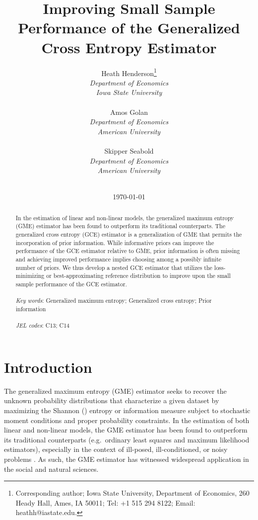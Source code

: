 \documentclass[english]{article}
\title{Improving Small Sample Performance of the Generalized Cross 
Entropy Estimator}
\author{
Heath Henderson\thanks{Corresponding author; Iowa State University,
Department of Economics, 260 Heady Hall, Ames, IA 50011; 
Tel: +1 515 294 8122;  Email: heathh@iastate.edu.}\\
\textit{Department of Economics} \\
\textit{Iowa State University} \\
\\
Amos Golan \\
\textit{Department of Economics}\\
\textit{American University} \\
\\
Skipper Seabold \\
\textit{Department of Economics}\\
\textit{American University}
\\ \\
}
\date{\today}
\begin{document}

\begin{titlepage}
\maketitle

\begin{abstract}
In the estimation of linear and non-linear models, the generalized maximum 
entropy (GME) estimator has been found to outperform its traditional 
counterparts.
The generalized cross entropy (GCE) estimator is a generalization of GME
that permits the incorporation of prior information.
While informative priors can improve the performance of the GCE estimator 
relative to GME, prior information is often missing and achieving improved 
performance implies choosing among a possibly infinite number of priors.
We thus develop a nested GCE estimator that utilizes the loss-minimizing or 
best-approximating reference distribution to improve upon the small sample
performance of the GCE estimator. \\
~\\
\textit{Key words}: Generalized maximum entropy; Generalized cross 
entropy; Prior information\\
~ \\
\textit{JEL codes}: C13; C14  
\end{abstract}
\thispagestyle{empty}
\end{titlepage}
\newpage


\doublespacing


\section{Introduction}
\label{sec: intro}

The generalized maximum entropy (GME) estimator seeks to recover the 
unknown probability distributions that characterize a given dataset by 
maximizing the Shannon (\citeyear{shannon1948}) entropy or information 
measure subject to stochastic moment conditions and proper probability 
constraints.
In the estimation of both linear and non-linear models, the GME estimator
has been found to outperform its traditional counterparts (e.g.\ ordinary 
least squares and maximum likelihood estimators), especially in the context 
of ill-posed, ill-conditioned, or noisy problems \citep{golan1996}.
As such, the GME estimator has witnessed widespread application in the 
social and natural sciences.
\end{document}
